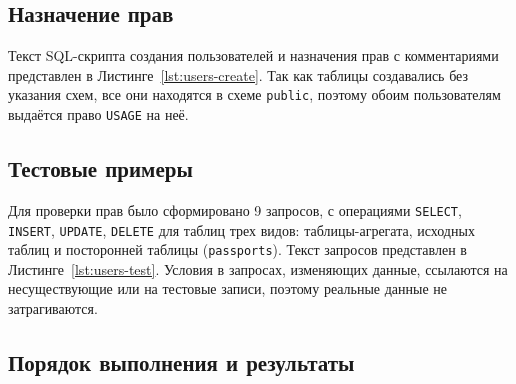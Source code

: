 \vspace{8pt}


\subsection{Назначение прав} \noindent

Текст SQL-скрипта создания пользователей и назначения прав с комментариями представлен в Листинге~\ref{lst:users-create}. Так как таблицы создавались без указания схем, все они находятся в схеме \texttt{public}, поэтому обоим пользователям выдаётся право \texttt{USAGE} на неё.

\newpage



\subsection{Тестовые примеры} \noindent

Для проверки прав было сформировано 9 запросов, с операциями \texttt{SELECT}, \texttt{INSERT}, \texttt{UPDATE}, \texttt{DELETE} для таблиц трех видов: таблицы-агрегата, исходных таблиц и посторонней таблицы (\texttt{passports}). Текст запросов представлен в Листинге~\ref{lst:users-test}. Условия в запросах, изменяющих данные, ссылаются на несуществующие или на тестовые записи, поэтому реальные данные не затрагиваются. \par



\subsection{Порядок выполнения и результаты} \noindent

